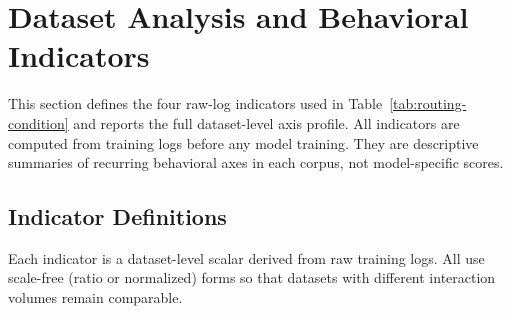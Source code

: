 \section{Dataset Analysis and Behavioral Indicators}
\label{app:dataset-analysis}

This section defines the four raw-log indicators used in Table~\ref{tab:routing-condition} and reports the full dataset-level axis profile. All indicators are computed from training logs before any model training. They are descriptive summaries of recurring behavioral axes in each corpus, not model-specific scores.

\subsection{Indicator Definitions}
\label{sec:b1}

Each indicator is a dataset-level scalar derived from raw training logs. All use scale-free (ratio or normalized) forms so that datasets with different interaction volumes remain comparable.

